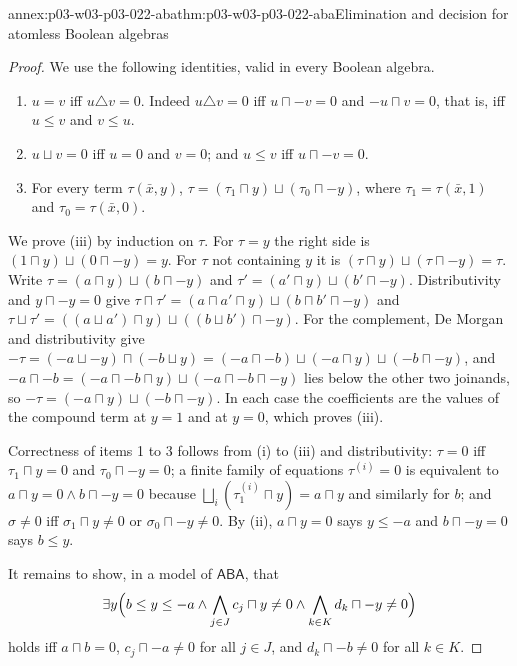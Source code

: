 \begin{annexitem}{annex:p03-w03-p03-022-aba}{thm:p03-w03-p03-022-aba}{Elimination and decision for atomless Boolean algebras}
\begin{proof}
We use the following identities, valid in every Boolean algebra.
\begin{enumerate}
\item[(i)] \(u=v\) iff \(u\triangle v=0\). Indeed \(u\triangle v=0\) iff
  \(u\sqcap-v=0\) and \(-u\sqcap v=0\), that is, iff \(u\le v\) and \(v\le u\).
\item[(ii)] \(u\sqcup v=0\) iff \(u=0\) and \(v=0\); and \(u\le v\) iff
  \(u\sqcap-v=0\).
\item[(iii)] For every term \(\tau(\bar x,y)\),
  \(\tau=(\tau_1\sqcap y)\sqcup(\tau_0\sqcap-y)\), where
  \(\tau_1=\tau(\bar x,1)\) and \(\tau_0=\tau(\bar x,0)\).
\end{enumerate}
We prove (iii) by induction on \(\tau\). For \(\tau=y\) the right side is
\((1\sqcap y)\sqcup(0\sqcap-y)=y\). For \(\tau\) not containing \(y\) it is
\((\tau\sqcap y)\sqcup(\tau\sqcap-y)=\tau\). Write
\(\tau=(a\sqcap y)\sqcup(b\sqcap-y)\) and \(\tau'=(a'\sqcap y)\sqcup(b'\sqcap-y)\).
Distributivity and \(y\sqcap-y=0\) give
\(\tau\sqcap\tau'=(a\sqcap a'\sqcap y)\sqcup(b\sqcap b'\sqcap-y)\) and
\(\tau\sqcup\tau'=((a\sqcup a')\sqcap y)\sqcup((b\sqcup b')\sqcap-y)\).
For the complement, De Morgan and distributivity give
\(-\tau=(-a\sqcup-y)\sqcap(-b\sqcup y)
=(-a\sqcap-b)\sqcup(-a\sqcap y)\sqcup(-b\sqcap-y)\), and
\(-a\sqcap-b=(-a\sqcap-b\sqcap y)\sqcup(-a\sqcap-b\sqcap-y)\) lies below the
other two joinands, so \(-\tau=(-a\sqcap y)\sqcup(-b\sqcap-y)\). In each case
the coefficients are the values of the compound term at \(y=1\) and at
\(y=0\), which proves (iii).

Correctness of items 1 to 3 follows from (i) to (iii) and distributivity:
\(\tau=0\) iff \(\tau_1\sqcap y=0\) and \(\tau_0\sqcap-y=0\); a finite family
of equations \(\tau^{(i)}=0\) is equivalent to \(a\sqcap y=0\land b\sqcap-y=0\)
because \(\bigsqcup_i(\tau^{(i)}_1\sqcap y)=a\sqcap y\) and similarly for
\(b\); and \(\sigma\ne0\) iff \(\sigma_1\sqcap y\ne0\) or
\(\sigma_0\sqcap-y\ne0\). By (ii), \(a\sqcap y=0\) says \(y\le-a\) and
\(b\sqcap-y=0\) says \(b\le y\).

It remains to show, in a model of \(\mathsf{ABA}\), that
\[
 \exists y\Bigl(b\le y\le-a\land\bigwedge_{j\in J}c_j\sqcap y\ne0
   \land\bigwedge_{k\in K}d_k\sqcap-y\ne0\Bigr)
\]
holds iff \(a\sqcap b=0\), \(c_j\sqcap-a\ne0\) for all \(j\in J\), and
\(d_k\sqcap-b\ne0\) for all \(k\in K\).


\end{proof}
\end{annexitem}
